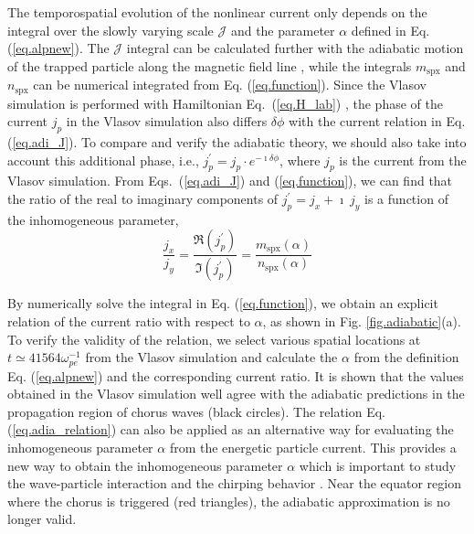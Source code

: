 The temporospatial evolution of the nonlinear current only depends on the integral over the slowly varying scale $\mathcal{J}$ and the parameter $\alpha$ defined in Eq. (\ref{eq.alpnew}). 
The $\mathcal{J}$ integral can be calculated further with the adiabatic motion of the trapped particle along the magnetic field line \cite{summers2012}, while the integrals $m_\mathrm{spx}$ and $n_\mathrm{spx}$ can be numerical integrated from Eq. (\ref{eq.function}).
Since the Vlasov simulation is performed with Hamiltonian Eq.~(\ref{eq.H_lab})
\cite{zheng2023b,zheng2024}, the phase of the current $j_p$ in the Vlasov simulation also differs $\delta \phi$ with the current relation in Eq. (\ref{eq.adi_J}).
To compare and verify the adiabatic theory, we should also take into account this additional phase, i.e., $j^\prime_{p} = j_p \cdot e^{-\imath \delta \phi}$, where $j_p$ is the current from the Vlasov simulation. 
From Eqs.~(\ref{eq.adi_J}) and (\ref{eq.function}), we can find that the ratio of the real to imaginary components of $j^\prime_{p}=j_x+\imath~ j_y$ is a function of the inhomogeneous parameter, 
\begin{equation}\label{eq.adia_relation}
\frac{j_x}{j_y} 
= \frac{{\Re}(j^\prime_p)}{{\Im}(j^\prime_p)} 
= \frac{m_\mathrm{spx}(\alpha)}{n_\mathrm{spx}(\alpha)}
\end{equation}

By numerically solve the integral in Eq. (\ref{eq.function}), we obtain an explicit relation of the current ratio with respect to $\alpha$, as shown in Fig. \ref{fig.adiabatic}(a). 
To verify the validity of the relation, we select various spatial locations at $t\simeq41564\omega_{pe}^{-1}$ from the Vlasov simulation \cite{zheng2023b,zheng2024} and calculate the $\alpha$ from the definition Eq. (\ref{eq.alpnew}) and the corresponding current ratio.
It is shown that the values obtained in the Vlasov simulation  well agree with the adiabatic predictions in the propagation region of chorus waves (black circles).
The  relation  Eq. (\ref{eq.adia_relation}) can also be applied as an alternative way for evaluating the inhomogeneous parameter $\alpha$ from the energetic particle current.
This provides a new way to obtain the inhomogeneous parameter $\alpha$ which is important to study the wave-particle interaction and the chirping behavior \cite{tao_theoretical_2020,omura2008}.
Near the equator region where the chorus is triggered (red triangles), the adiabatic approximation is no longer valid.

